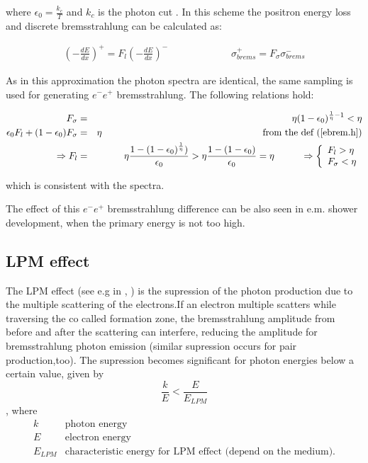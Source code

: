 where $\epsilon_{0} = \frac{k_c}{T}$ and $k_c$ is the photon
cut . In this scheme the positron energy loss and
discrete bremsstrahlung can be calculated as:

\begin{eqnarray*}
\left ( - \frac{dE}{dx} \right )^{+} = F_{l}
\left ( - \frac{dE}{dx} \right )^{-} & \hspace{2cm} &
\sigma^{+}_{brems} = F_{\sigma} \sigma^{-}_{brems}
\end{eqnarray*}

As in this approximation the photon spectra are identical, the
same sampling is used for generating $e^- e^+$ bremsstrahlung.
The following relations hold:

\begin{eqnarray*}
F_{\sigma} & = & \eta (1-\epsilon_{0})^{\frac{1}{\eta}-1}
< \eta \\
\epsilon_{0} F_{l} + (1-\epsilon_{0}) F_{\sigma} & = & \eta
\hspace{6cm} \mbox{from the def (\ref{ebrem.h})} \\
\Rightarrow F_{l} & = & \eta \frac{1-(1-\epsilon_{0})^{\frac{1}
{\eta}})}{\epsilon_{0}} > \eta \frac{1-(1-\epsilon_{0})}
{\epsilon_{0}} = \eta  \hspace{1cm}
\Rightarrow   \left \{
\begin{array}{l}
F_{l} > \eta \\
F_{\sigma} < \eta
\end{array} \right .
\end{eqnarray*}

which is consistent with the spectra.

The effect of this $e^- e^+$ bremsstrahlung difference can be also
seen in e.m. shower development, when the primary energy is not too
high. 

\subsection{LPM effect}

The LPM effect (see e.g in \cite{ebrem.galitsky},\cite{ebrem.anthony} )
 is the supression of the photon production due to the
multiple scattering of the electrons.If an electron multiple scatters
while traversing the co called formation zone, the bremsstrahlung
amplitude from before and after the scattering can interfere, reducing the
amplitude for bremsstrahlung photon emission (similar supression occurs 
for pair production,too). The supression becomes significant for photon
energies below a certain value, given by
\begin{equation}
\label{ebrem.k}
 \frac{k}{E} < \frac{E}{E_{LPM}}
\end{equation}
 , where
\[
\begin{array}{ll}
k    & \mbox{photon energy} \\
E    & \mbox{electron energy} \\
E_{LPM} & \mbox{characteristic energy for LPM effect (depend on the medium).} 
\end{array}
\]

